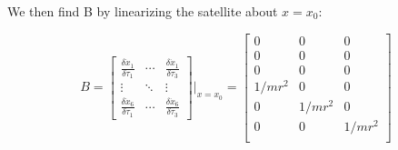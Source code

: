 We then find B by linearizing the satellite about $x = x_0$:

\begin{equation*}
    B =
    \begin{bmatrix}
        \frac{\delta\dot{x}_1}{\delta \tau_1}  &   \cdots  &   \frac{\delta\dot{x}_1}{\delta\tau_3}\\
        \vdots                              &   \ddots  &   \vdots\\
        \frac{\delta\dot{x}_6}{\delta \tau_1}  &   \cdots  &   \frac{\delta\dot{x}_6}{\delta \tau_3}
    \end{bmatrix}\Biggr|_{x=x_0}
    =
    \begin{bmatrix}
        0       &   0       &   0       \\
        0       &   0       &   0       \\
        0       &   0       &   0       \\
        1/mr^2  &   0       &   0       \\
        0       &   1/mr^2  &   0       \\
        0       &   0       &   1/mr^2  \\
    \end{bmatrix}
\end{equation*}

